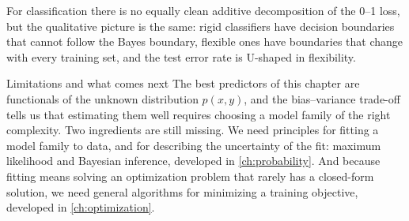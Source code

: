 For classification there is no equally clean additive decomposition of the 0--1 loss, but the qualitative picture is the same: rigid classifiers have decision boundaries that cannot follow the Bayes boundary, flexible ones have boundaries that change with every training set, and the test error rate is U-shaped in flexibility.

\begin{notebox}{Limitations and what comes next}
The best predictors of this chapter are functionals of the unknown distribution $p(x,y)$, and the bias--variance trade-off tells us that estimating them well requires choosing a model family of the right complexity. Two ingredients are still missing. We need principles for fitting a model family to data, and for describing the uncertainty of the fit: maximum likelihood and Bayesian inference, developed in \cref{ch:probability}. And because fitting means solving an optimization problem that rarely has a closed-form solution, we need general algorithms for minimizing a training objective, developed in \cref{ch:optimization}.
\end{notebox}
